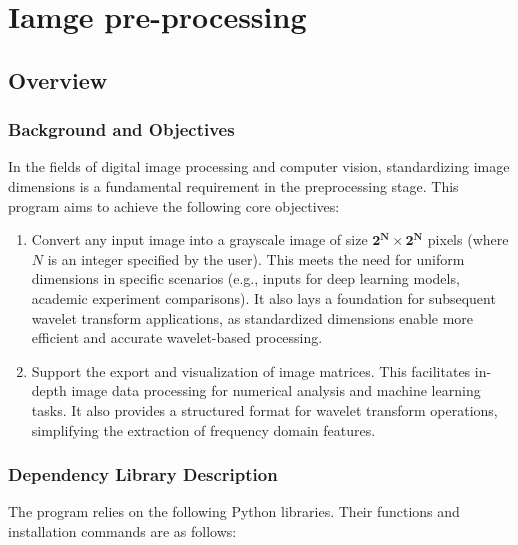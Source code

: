 \documentclass{article}
\theoremstyle{definition} %
\begin{document}
\section{Iamge pre-processing}
\subsection{Overview}
\subsubsection{Background and Objectives}
In the fields of digital image processing and computer vision, standardizing image dimensions is a fundamental requirement in the preprocessing stage. This program aims to achieve the following core objectives:
\begin{enumerate}
    \item Convert any input image into a grayscale image of size \(\mathbf{2^N \times 2^N}\) pixels (where \(N\) is an integer specified by the user). This meets the need for uniform dimensions in specific scenarios (e.g., inputs for deep learning models, academic experiment comparisons). It also lays a foundation for subsequent wavelet transform applications, as standardized dimensions enable more efficient and accurate wavelet-based processing.
    \item Support the export and visualization of image matrices. This facilitates in-depth image data processing for numerical analysis and machine learning tasks. It also provides a structured format for wavelet transform operations, simplifying the extraction of frequency domain features.
\end{enumerate}

\subsubsection{Dependency Library Description}
The program relies on the following Python libraries. Their functions and installation commands are as follows:
\end{document}
